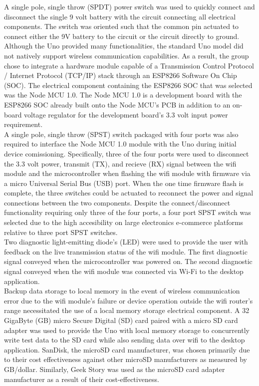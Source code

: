 \documentclass[12pt, titlepage]{article}
\begin{document}
A single pole, single throw (SPDT) power switch was used to quickly connect and disconnect the single 9 volt battery with the circuit connecting all electrical components. The switch was oriented such that the common pin actuated to connect either the 9V battery to the circuit or the circuit directly to ground. \\

Although the Uno provided many functionalities, the standard Uno model did not natively support wireless communication capabilities. As a result, the group chose to integrate a hardware module capable of a Transmission Control Protocol / Internet Protocol (TCP/IP) stack through an ESP8266 Software On Chip (SOC). The electrical component containing the ESP8266 SOC that was selected was the Node MCU 1.0. The Node MCU 1.0 is a development board with the ESP8266 SOC already built onto the Node MCU's PCB in addition to an on-board voltage regulator for the development board's 3.3 volt input power requirement. \\

A single pole, single throw (SPST) switch packaged with four ports was also required to interface the Node MCU 1.0 module with the Uno during initial device comissioning. Specifically, three of the four ports were used to disconnect the 3.3 volt power, transmit (TX), and recieve (RX) signal between the wifi module and the microcontroller when flashing the wifi module with firmware via a micro Universal Serial Bus (USB) port. When the one time firmware flash is complete, the three switches could be actuated to reconnect the power and signal connections between the two components. Despite the connect/disconnect functionality requiring only three of the four ports, a four port SPST switch was selected due to the high accesibility on large electronics e-commerce platforms relative to three port SPST switches. \\

Two diagnostic light-emitting diode's (LED) were used to provide the user with feedback on the live transmission status of the wifi module. The first diagnostic signal conveyed when the microcontroller was powered on. The second diagnostic signal conveyed when the wifi module was connected via Wi-Fi to the desktop application.  \\

Backup data storage to local memory in the event of wireless communication error due to the wifi module's failure or device operation outside the wifi router's range necessitated the use of a local memory storage electrical component. A 32 GigaByte (GB) micro Secure Digital (SD) card paired with a micro SD card adapter was used to provide the Uno with local memory storage to concurrently write test data to the SD card while also sending data over wifi to the desktop application. SanDisk, the microSD card manufacturer, was chosen primarily due to their cost effectiveness against other microSD manufacturers as measured by GB/dollar. Similarly, Geek Story was used as the microSD card adapter manufacturer as a result of their cost-effectiveness. \\
\end{document}
